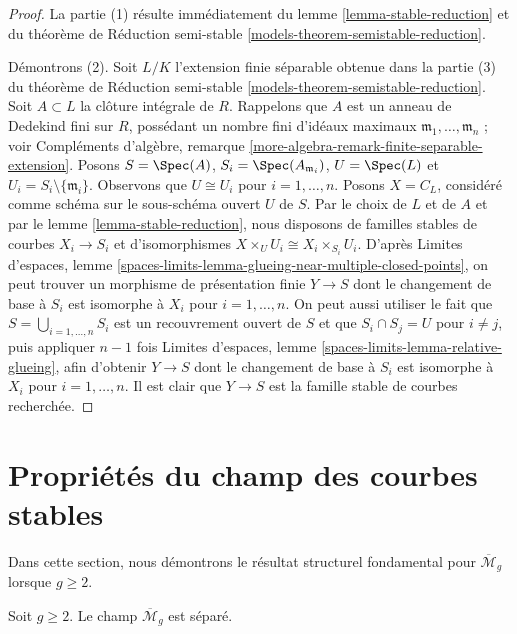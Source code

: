 \begin{proof}
La partie (1) résulte immédiatement du lemme \ref{lemma-stable-reduction} et du
théorème de Réduction semi-stable \ref{models-theorem-semistable-reduction}.

\medskip\noindent
Démontrons (2). Soit $L/K$ l'extension finie séparable obtenue dans la partie (3) du
théorème de Réduction semi-stable \ref{models-theorem-semistable-reduction}.
Soit $A \subset L$ la clôture intégrale de $R$.
Rappelons que $A$ est un anneau de Dedekind fini sur $R$, possédant
un nombre fini d'idéaux maximaux $\mathfrak m_1, \ldots, \mathfrak m_n$ ; voir
Compléments d'algèbre, remarque \ref{more-algebra-remark-finite-separable-extension}.
Posons $S = \Spec(A)$, $S_i = \Spec(A_{\mathfrak m_i})$,
$U = \Spec(L)$ et $U_i = S_i \setminus \{\mathfrak m_i\}$.
Observons que $U \cong U_i$ pour $i = 1, \ldots, n$.
Posons $X = C_L$, considéré comme schéma sur le sous-schéma ouvert $U$ de $S$.
Par le choix de $L$ et de $A$ et par le lemme \ref{lemma-stable-reduction},
nous disposons de familles stables de courbes $X_i \to S_i$ et d'isomorphismes
$X \times_U U_i \cong X_i \times_{S_i} U_i$.
D'après Limites d'espaces, lemme
\ref{spaces-limits-lemma-glueing-near-multiple-closed-points},
on peut trouver un morphisme de présentation finie $Y \to S$
dont le changement de base à $S_i$ est isomorphe à $X_i$ pour $i = 1, \ldots, n$.
On peut aussi utiliser le fait que $S = \bigcup_{i = 1, \ldots, n} S_i$
est un recouvrement ouvert de $S$ et que $S_i \cap S_j = U$ pour $i \not = j$,
puis appliquer $n - 1$ fois
Limites d'espaces, lemme \ref{spaces-limits-lemma-relative-glueing},
afin d'obtenir $Y \to S$ dont le
changement de base à $S_i$ est isomorphe à $X_i$ pour $i = 1, \ldots, n$.
Il est clair que $Y \to S$ est la famille stable de courbes recherchée.
\end{proof}






\section{Propriétés du champ des courbes stables}
\label{section-properties-stable}

\noindent
Dans cette section, nous démontrons le résultat structurel fondamental pour
$\overline{\mathcal{M}}_g$ lorsque $g \geq 2$.

\begin{lemma}
\label{lemma-stable-separated}
Soit $g \geq 2$. Le champ $\overline{\mathcal{M}}_g$ est séparé.
\end{lemma}

